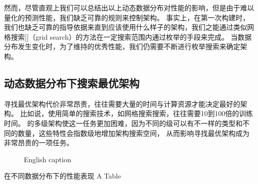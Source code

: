 然而，尽管直观上我们可以总结出以上动态数据分布对{\li}性能的影响，但是由于{\model}难以量化的预测性能，我们缺乏可靠的规则来控制{\rmi}架构。
事实上，在第一次构建{\li}时，我们也缺乏可靠的指导依据来直到应该使用什么样子的{\rmi}架构，我们之能通过类似网格搜索[]（grid search）的方法在一定搜索范围内通过枚举的手段来完成。
当数据分布发生变化时，为了维持{\li}的优秀性能，我们仍需要不断进行枚举搜索来确定{\rmi}架构。

\subsection{动态数据分布下搜索最优{\li}架构}
\label{sec:search-best}

寻找最优{\li}架构代价非常昂贵，往往需要大量的时间与计算资源才能决定最好的{\li}架构。
比如说，使用简单的搜索技术，如网格搜索搜索，往往需要10到100倍的训练时间。
{\li}的多级架构使这一任务更加困难，因为不同的级可以有不一样的{\model}类型和不同的{\model}数量，这些特性会指数级地增加架构搜索空间，
从而影响寻找最优{\li}架构成为非常昂贵的一项任务。

% 

\begin{figure}[!htp]
  \centering
    {English caption}
  \label{fig:dist}
\end{figure}

\begin{table}[!hpb]
  \centering
  \bicaption[指向一个表格的表目录索引]
    {{\li}在不同数据分布下的性能表现}
    {A Table}
  \label{tab:dist}
  \begin{tabular}{@{}llr@{}} \toprule
  \end{tabular}
\end{table}

